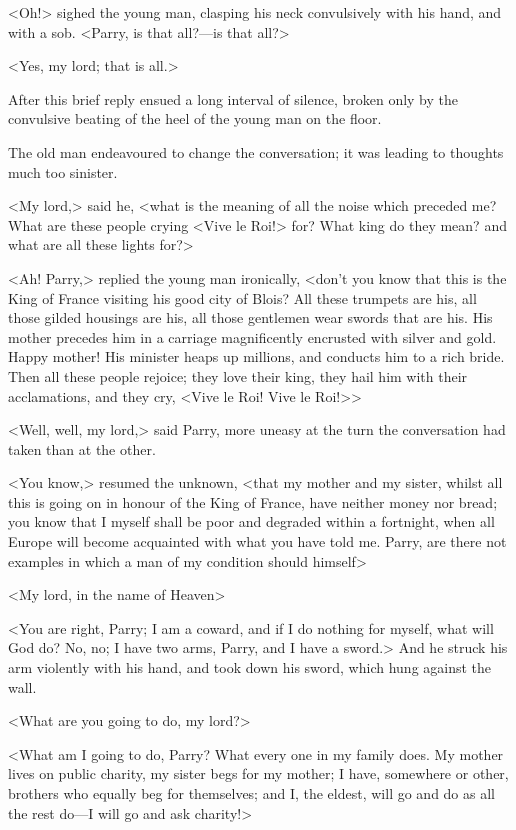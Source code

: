 <Oh!> sighed the young man, clasping his neck convulsively with his hand, and with a sob. <Parry, is that all?—is that all?>

<Yes, my lord; that is all.>

After this brief reply ensued a long interval of silence, broken only by the convulsive beating of the heel of the young man on the floor.

The old man endeavoured to change the conversation; it was leading to thoughts much too sinister.

<My lord,> said he, <what is the meaning of all the noise which preceded me? What are these people crying <Vive le Roi!> for? What king do they mean? and what are all these lights for?>

<Ah! Parry,> replied the young man ironically, <don't you know that this is the King of France visiting his good city of Blois? All these trumpets are his, all those gilded housings are his, all those gentlemen wear swords that are his. His mother precedes him in a carriage magnificently encrusted with silver and gold. Happy mother! His minister heaps up millions, and conducts him to a rich bride. Then all these people rejoice; they love their king, they hail him with their acclamations, and they cry, <Vive le Roi! Vive le Roi!>>

<Well, well, my lord,> said Parry, more uneasy at the turn the conversation had taken than at the other.

<You know,> resumed the unknown, <that my mother and my sister, whilst all this is going on in honour of the King of France, have neither money nor bread; you know that I myself shall be poor and degraded within a fortnight, when all Europe will become acquainted with what you have told me. Parry, are there not examples in which a man of my condition should himself\longdash>

<My lord, in the name of Heaven\longdash>

<You are right, Parry; I am a coward, and if I do nothing for myself, what will God do? No, no; I have two arms, Parry, and I have a sword.> And he struck his arm violently with his hand, and took down his sword, which hung against the wall.

<What are you going to do, my lord?>

<What am I going to do, Parry? What every one in my family does. My mother lives on public charity, my sister begs for my mother; I have, somewhere or other, brothers who equally beg for themselves; and I, the eldest, will go and do as all the rest do—I will go and ask charity!>

